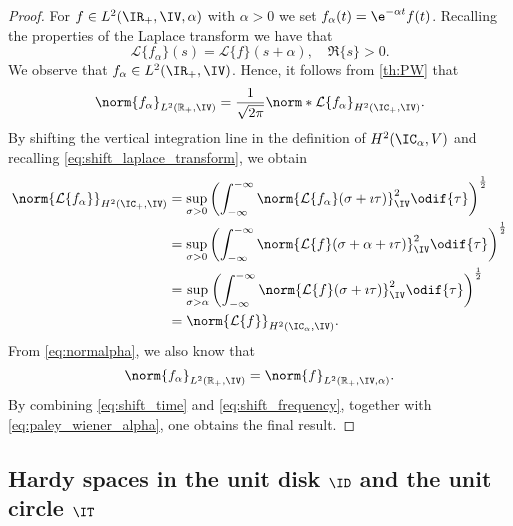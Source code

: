 \begin{proof}
For $f \in L^2(\IR_+,\IV,\alpha)$ with $\alpha>0$ we set $f_\alpha(t) = \e^{-\alpha t}f(t)$. Recalling the properties of the Laplace transform
we have that
\begin{equation}\label{eq:shift_laplace_transform}
	\mathcal{L} \{f_\alpha\}(s)	= \mathcal{L}\{f\}(s+\alpha), \quad \Re\{s\} > 0.
\end{equation}
We observe that $f_\alpha \in L^2(\IR_+,\IV)$. Hence, it follows from \cref{th:PW} that
\begin{equation}\label{eq:paley_wiener_alpha}
	\norm{f_\alpha}_{L^2(\mathbb{R}_+, \IV)} = \frac{1}{\sqrt{2\pi}} \norm*{\mathcal{L}\{f_\alpha\}}_{H^2(\IC_+,\IV)}.
\end{equation}
By shifting the vertical integration line in the definition of
$H^2(\IC_\alpha,V)$ and recalling \eqref{eq:shift_laplace_transform}, we obtain 
\begin{equation}\label{eq:shift_frequency}
\begin{aligned}
	\norm{ \mathcal{L}\{f_\alpha\}}_{H^2(\IC_+,\IV)} &= \sup_{\sigma>0} \left(\int_{-\infty}^{-\infty} \norm{\mathcal{L}\{f_\alpha\}(\sigma+\imath \tau)}^2_\IV  \odif{\tau} \right)^{\frac{1}{2}} \\
    &= \sup_{\sigma>0} \left( \int_{-\infty}^{-\infty} \norm{\mathcal{L} \{f \}(\sigma+\alpha+\imath\tau) }^2_\IV \odif{\tau} \right)^{\frac{1}{2}} \\
	&= \sup_{\sigma>\alpha} \left( \int_{-\infty}^{-\infty} \norm{\mathcal{L} \{f\}(\sigma+\imath\tau)}^2_\IV \odif{\tau} \right)^{\frac{1}{2}} \\
	&= \norm{ \mathcal{L}\{f\} }_{H^2(\IC_\alpha,\IV)}.
\end{aligned}
\end{equation}
From \cref{eq:normalpha}, we also know that 
\begin{equation}\label{eq:shift_time}
	\norm{f_\alpha}_{L^2(\mathbb{R}_+,\IV)} = \norm{f}_{L^2(\mathbb{R}_+,\IV,\alpha)}.
\end{equation}
By combining \cref{eq:shift_time} and \cref{eq:shift_frequency}, together with \cref{eq:paley_wiener_alpha}, one obtains the final result.
\end{proof}


\subsection{Hardy spaces in the unit disk \texorpdfstring{$\ID$}{D} and the unit circle \texorpdfstring{$\IT$}{T}}

